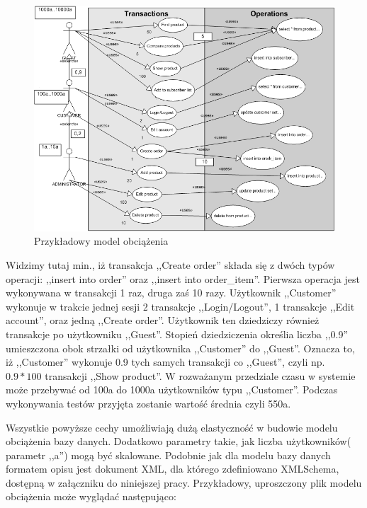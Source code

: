\begin{figure}[h]
\begin{center}
\includegraphics[width=1.0\linewidth]{figures/load-model.png}
\end{center}
\caption{Przykładowy model obciążenia}\label{rys:load-model}
\end{figure}
Widzimy tutaj min., iż transakcja ,,Create order'' składa się z dwóch typów operacji: ,,insert into order'' 
oraz ,,insert into order\_item''. Pierwsza operacja jest wykonywana w transakcji 1 raz, druga zaś 10 razy.
Użytkownik ,,Customer'' wykonuje w trakcie jednej sesji 2 transakcje ,,Login/Logout'', 1 transakcje ,,Edit account'',
oraz jedną ,,Create order''. Użytkownik ten dziedziczy również transakcje po użytkowniku ,,Guest''. Stopień dziedziczenia
określia liczba ,,0.9'' umieszczona obok strzałki od użytkownika ,,Customer'' do ,,Guest''. Oznacza to, iż 
,,Customer'' wykonuje 0.9 tych samych transakcji co ,,Guest'', czyli np. $0.9 * 100$ transakcji ,,Show product''.
W rozważanym przedziale czasu w systemie może przebywać od 100a do 1000a użytkowników typu ,,Customer''. Podczas wykonywania testów
przyjęta zostanie wartość średnia czyli 550a. 

Wszystkie powyższe cechy umożliwiają dużą elastyczność w budowie modelu obciążenia bazy danych.
Dodatkowo parametry takie, jak liczba użytkowników( parametr ,,a'') mogą być skalowane. 
Podobnie jak dla modelu bazy danych formatem opisu jest dokument XML,
dla którego zdefiniowano XMLSchema, dostępną w załączniku do niniejszej pracy.
Przykładowy, uproszczony plik modelu obciążenia może wyglądać następująco:

